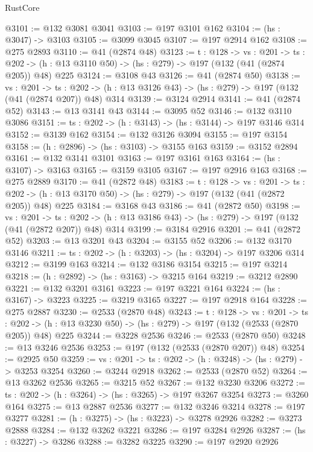 \begin{lexlean}{RustCore}
\begin{coremodule}
@3101 := @132 @3081 @3041
@3103 := @197 @3101 @162
@3104 := (hs : @3047) -> @3103
@3105 := @3099 @3045
@3107 := @197 @2914 @162
@3108 := @275 @2893
@3110 := @41 (@2874 @48)
@3123 := {t : @128} ->
  {vs : @201} ->
  {ts : @202} -> (h : @13 @3110 @50) -> (hs : @279) -> @197 (@132 (@41 (@2874 @205)) @48) @225
@3124 := @3108 @43
@3126 := @41 (@2874 @50)
@3138 := {vs : @201} ->
  {ts : @202} -> (h : @13 @3126 @43) -> (hs : @279) -> @197 (@132 (@41 (@2874 @207)) @48) @314
@3139 := @3124 @2914
@3141 := @41 (@2874 @52)
@3143 := @13 @3141 @43
@3144 := @3095 @52
@3146 := @132 @3110 @3086
@3151 := {ts : @202} -> (h : @3143) -> (hs : @3144) -> @197 @3146 @314
@3152 := @3139 @162
@3154 := @132 @3126 @3094
@3155 := @197 @3154
@3158 := (h : @2896) -> (hs : @3103) -> @3155 @163
@3159 := @3152 @2894
@3161 := @132 @3141 @3101
@3163 := @197 @3161 @163
@3164 := (hs : @3107) -> @3163
@3165 := @3159 @3105
@3167 := @197 @2916 @163
@3168 := @275 @2889
@3170 := @41 (@2872 @48)
@3183 := {t : @128} ->
  {vs : @201} ->
  {ts : @202} -> (h : @13 @3170 @50) -> (hs : @279) -> @197 (@132 (@41 (@2872 @205)) @48) @225
@3184 := @3168 @43
@3186 := @41 (@2872 @50)
@3198 := {vs : @201} ->
  {ts : @202} -> (h : @13 @3186 @43) -> (hs : @279) -> @197 (@132 (@41 (@2872 @207)) @48) @314
@3199 := @3184 @2916
@3201 := @41 (@2872 @52)
@3203 := @13 @3201 @43
@3204 := @3155 @52
@3206 := @132 @3170 @3146
@3211 := {ts : @202} -> (h : @3203) -> (hs : @3204) -> @197 @3206 @314
@3212 := @3199 @163
@3214 := @132 @3186 @3154
@3215 := @197 @3214
@3218 := (h : @2892) -> (hs : @3163) -> @3215 @164
@3219 := @3212 @2890
@3221 := @132 @3201 @3161
@3223 := @197 @3221 @164
@3224 := (hs : @3167) -> @3223
@3225 := @3219 @3165
@3227 := @197 @2918 @164
@3228 := @275 @2887
@3230 := @2533 (@2870 @48)
@3243 := {t : @128} ->
  {vs : @201} ->
  {ts : @202} -> (h : @13 @3230 @50) -> (hs : @279) -> @197 (@132 (@2533 (@2870 @205)) @48) @225
@3244 := @3228 @2536
@3246 := @2533 (@2870 @50)
@3248 := @13 @3246 @2536
@3253 := @197 (@132 (@2533 (@2870 @207)) @48)
@3254 := @2925 @50
@3259 := {vs : @201} -> {ts : @202} -> (h : @3248) -> (hs : @279) -> @3253 @3254
@3260 := @3244 @2918
@3262 := @2533 (@2870 @52)
@3264 := @13 @3262 @2536
@3265 := @3215 @52
@3267 := @132 @3230 @3206
@3272 := {ts : @202} -> (h : @3264) -> (hs : @3265) -> @197 @3267 @3254
@3273 := @3260 @164
@3275 := @13 @2887 @2536
@3277 := @132 @3246 @3214
@3278 := @197 @3277
@3281 := (h : @3275) -> (hs : @3223) -> @3278 @2926
@3282 := @3273 @2888
@3284 := @132 @3262 @3221
@3286 := @197 @3284 @2926
@3287 := (hs : @3227) -> @3286
@3288 := @3282 @3225
@3290 := @197 @2920 @2926

\end{coremodule}
\end{lexlean}
